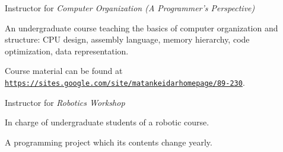 \documentclass[10pt]{article}
\newcommand{\halfblankline}{\quad\vspace{-0.5\baselineskip}\pagebreak[3]}
\providecommand*\url[1]{\href{#1}{#1}}
\renewcommand*\url[1]{\href{#1}{\texttt{#1}}}
\begin{document}
\begin{outerlist}
\begin{innerlist}
        \halfblankline
		\item Instructor for \emph{Computer Organization (A Programmer's
		Perspective)}
        \begin{innerlist}
            \item An undergraduate course teaching the basics of computer
            organization and structure: CPU design, assembly language, memory
            hierarchy, code \\ optimization, data representation.
            \item Course material can be found at\\
                \url{https://sites.google.com/site/matankeidarhomepage/89-230}.
        \end{innerlist}
        \halfblankline
        \item Instructor for \emph{Robotics Workshop}
        \begin{innerlist}
            \item In charge of undergraduate students of a robotic course.
			\item A programming project which its contents change yearly.  
        \end{innerlist}
        \halfblankline
    \end{innerlist}
\end{outerlist}






\end{document}
